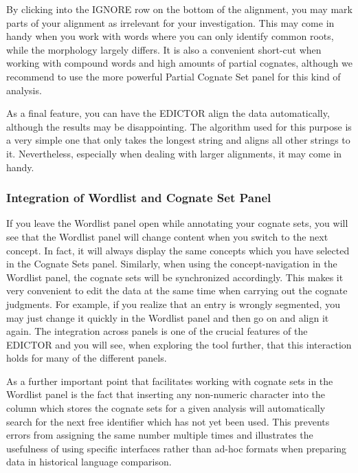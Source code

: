 \documentclass[a4paper,svgnames]{scrartcl}
\begin{document}
By clicking into the IGNORE row on the bottom of the alignment, you may
mark parts of your alignment as irrelevant for your investigation. This
may come in handy when you work with words where you can only identify
common roots, while the morphology largely differs. It is also a
convenient short-cut when working with compound words and high amounts
of partial cognates, although we recommend to use the more powerful
Partial Cognate Set panel for this kind of analysis.

As a final feature, you can have the EDICTOR align the data
automatically, although the results may be disappointing. The algorithm
used for this purpose is a very simple one that only takes the longest
string and aligns all other strings to it. Nevertheless, especially when
dealing with larger alignments, it may come in handy.

\subsubsection*{Integration of Wordlist and Cognate Set
Panel}\label{integration-of-wordlist-and-cognate-set-panel}

If you leave the Wordlist panel open while annotating your cognate sets,
you will see that the Wordlist panel will change content when you switch
to the next concept. In fact, it will always display the same concepts
which you have selected in the Cognate Sets panel. Similarly, when using
the concept-navigation in the Wordlist panel, the cognate sets will be
synchronized accordingly. This makes it very convenient to edit the data
at the same time when carrying out the cognate judgments. For example,
if you realize that an entry is wrongly segmented, you may just change
it quickly in the Wordlist panel and then go on and align it again. The
integration across panels is one of the crucial features of the EDICTOR
and you will see, when exploring the tool further, that this interaction
holds for many of the different panels.

As a further important point that facilitates working with cognate sets
in the Wordlist panel is the fact that inserting any non-numeric
character into the column which stores the cognate sets for a given
analysis will automatically search for the next free identifier which
has not yet been used. This prevents errors from assigning the same
number multiple times and illustrates the usefulness of using specific
interfaces rather than ad-hoc formats when preparing data in historical
language comparison.
\end{document}
